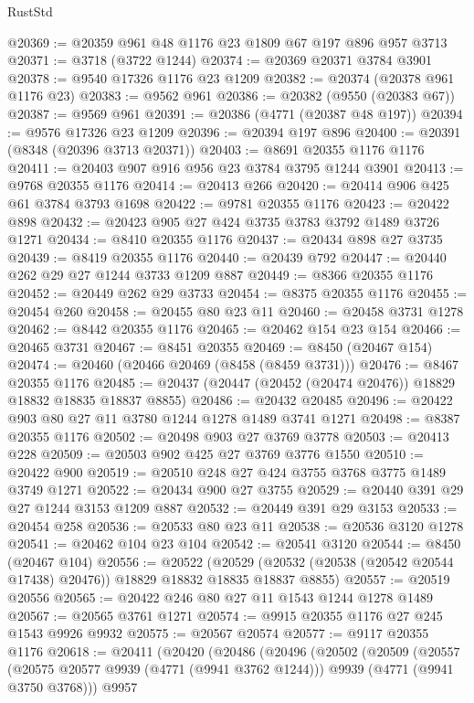 \begin{lexlean}{RustStd}
\begin{coremodule}
@20369 := @20359 @961 @48 @1176 @23 @1809 @67 @197 @896 @957 @3713
@20371 := @3718 (@3722 @1244)
@20374 := @20369 @20371 @3784 @3901
@20378 := @9540 @17326 @1176 @23 @1209
@20382 := @20374 (@20378 @961 @1176 @23)
@20383 := @9562 @961
@20386 := @20382 (@9550 (@20383 @67))
@20387 := @9569 @961
@20391 := @20386 (@4771 (@20387 @48 @197))
@20394 := @9576 @17326 @23 @1209
@20396 := @20394 @197 @896
@20400 := @20391 (@8348 (@20396 @3713 @20371))
@20403 := @8691 @20355 @1176 @1176
@20411 := @20403 @907 @916 @956 @23 @3784 @3795 @1244 @3901
@20413 := @9768 @20355 @1176
@20414 := @20413 @266
@20420 := @20414 @906 @425 @61 @3784 @3793 @1698
@20422 := @9781 @20355 @1176
@20423 := @20422 @898
@20432 := @20423 @905 @27 @424 @3735 @3783 @3792 @1489 @3726 @1271
@20434 := @8410 @20355 @1176
@20437 := @20434 @898 @27 @3735
@20439 := @8419 @20355 @1176
@20440 := @20439 @792
@20447 := @20440 @262 @29 @27 @1244 @3733 @1209 @887
@20449 := @8366 @20355 @1176
@20452 := @20449 @262 @29 @3733
@20454 := @8375 @20355 @1176
@20455 := @20454 @260
@20458 := @20455 @80 @23 @11
@20460 := @20458 @3731 @1278
@20462 := @8442 @20355 @1176
@20465 := @20462 @154 @23 @154
@20466 := @20465 @3731
@20467 := @8451 @20355
@20469 := @8450 (@20467 @154)
@20474 := @20460 (@20466 @20469 (@8458 (@8459 @3731)))
@20476 := @8467 @20355 @1176
@20485 := @20437 (@20447 (@20452 (@20474 @20476)) @18829 @18832 @18835 @18837 @8855)
@20486 := @20432 @20485
@20496 := @20422 @903 @80 @27 @11 @3780 @1244 @1278 @1489 @3741 @1271
@20498 := @8387 @20355 @1176
@20502 := @20498 @903 @27 @3769 @3778
@20503 := @20413 @228
@20509 := @20503 @902 @425 @27 @3769 @3776 @1550
@20510 := @20422 @900
@20519 := @20510 @248 @27 @424 @3755 @3768 @3775 @1489 @3749 @1271
@20522 := @20434 @900 @27 @3755
@20529 := @20440 @391 @29 @27 @1244 @3153 @1209 @887
@20532 := @20449 @391 @29 @3153
@20533 := @20454 @258
@20536 := @20533 @80 @23 @11
@20538 := @20536 @3120 @1278
@20541 := @20462 @104 @23 @104
@20542 := @20541 @3120
@20544 := @8450 (@20467 @104)
@20556 := @20522
    (@20529 (@20532 (@20538 (@20542 @20544 @17438) @20476)) @18829 @18832 @18835 @18837 @8855)
@20557 := @20519 @20556
@20565 := @20422 @246 @80 @27 @11 @1543 @1244 @1278 @1489
@20567 := @20565 @3761 @1271
@20574 := @9915 @20355 @1176 @27 @245 @1543 @9926 @9932
@20575 := @20567 @20574
@20577 := @9117 @20355 @1176
@20618 := @20411
    (@20420
      (@20486
        (@20496
          (@20502
            (@20509
              (@20557
                (@20575 @20577 @9939 (@4771 (@9941 @3762 @1244)))
                @9939
                (@4771 (@9941 @3750 @3768)))
              @9957

\end{coremodule}
\end{lexlean}
